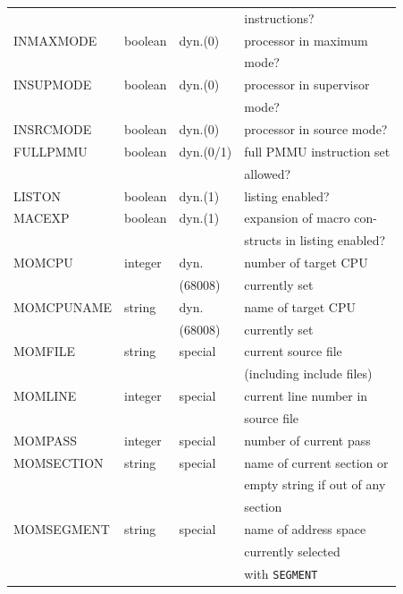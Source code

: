 \documentclass[12pt,twoside]{report}
\newcommand{\tty}[1]{{\tt #1}}
\begin{document}
\begin{center}
\begin{longtable}{|l|l|l|l|}
              &           &            & instructions? \\
INMAXMODE     & boolean   & dyn.(0)    & processor in maximum \\
              &           &            & mode? \\
INSUPMODE     & boolean   & dyn.(0)    & processor in supervisor \\
              &           &            & mode? \\
INSRCMODE     & boolean   & dyn.(0)    & processor in source mode? \\
FULLPMMU      & boolean   & dyn.(0/1)  & full PMMU instruction set \\
              &           &            & allowed? \\
LISTON        & boolean   & dyn.(1)    & listing enabled? \\
MACEXP        & boolean   & dyn.(1)    & expansion of macro con- \\
              &           &            & structs in listing enabled? \\
MOMCPU        & integer   & dyn.       & number of target CPU \\
	      & 	  & (68008)    & currently set \\
MOMCPUNAME    & string    & dyn.       & name of target CPU \\
              &           & (68008)    & currently set \\
MOMFILE       & string    & special    & current source file \\
              &           &            & (including include files) \\
MOMLINE       & integer   & special    & current line number in  \\
              &           &            & source file \\
MOMPASS       & integer   & special    & number of current pass \\
MOMSECTION    & string    & special    & name of current section or \\
	      & 	  &	       & empty string if out of any \\
              &           &            & section \\
MOMSEGMENT    & string    & special    & name of address space \\
              &           &            & currently selected \\
              &           &            & with \tty{SEGMENT} \\

\end{longtable}
\end{center}
\end{document}
